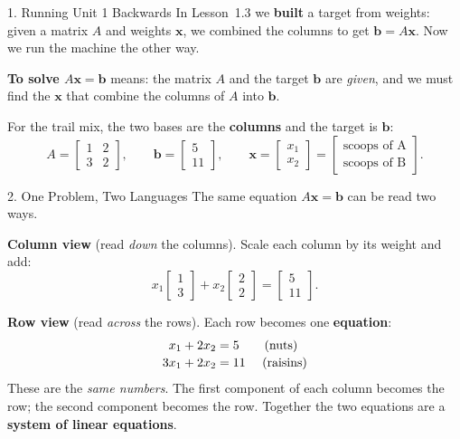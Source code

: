 \documentclass[10pt]{article}
\newcommand{\xx}{\mathbf{x}}
\newcommand{\bb}{\mathbf{b}}
\begin{document}
\begin{notesbox}{1. Running Unit 1 Backwards}
In Lesson~1.3 we \textbf{built} a target from weights: given a matrix $A$ and weights $\xx$, we
combined the columns to get $\bb = A\xx$. Now we run the machine the other way.

\vspace{2pt}
\textbf{To solve $A\xx=\bb$} means: the matrix $A$ and the target $\bb$ are \emph{given}, and we
must find the \blank{3.4cm} $\xx$ that combine the columns of $A$ into $\bb$.

\vspace{4pt}
For the trail mix, the two bases are the \textbf{columns} and the target is $\bb$:
\[
  A = \begin{bmatrix} 1 & 2 \\ 3 & 2 \end{bmatrix}, \qquad
  \bb = \begin{bmatrix} 5 \\ 11 \end{bmatrix}, \qquad
  \xx = \begin{bmatrix} x_1 \\ x_2 \end{bmatrix}
      = \begin{bmatrix} \text{scoops of A} \\ \text{scoops of B} \end{bmatrix}.
\]
\end{notesbox}

\begin{notesbox}{2. One Problem, Two Languages}
The same equation $A\xx=\bb$ can be read two ways.

\vspace{3pt}
\textbf{Column view} (read \emph{down} the columns). Scale each column by its weight and add:
\[
  x_1\begin{bmatrix} 1 \\ 3 \end{bmatrix} + x_2\begin{bmatrix} 2 \\ 2 \end{bmatrix}
  = \begin{bmatrix} 5 \\ 11 \end{bmatrix}.
\]

\textbf{Row view} (read \emph{across} the rows). Each row becomes one \textbf{equation}:
\[
  \begin{array}{r@{}c@{}l}
    x_1 &{}+ 2x_2 ={}& 5 \qquad (\text{nuts})\\[2pt]
    3x_1 &{}+ 2x_2 ={}& 11 \quad\ (\text{raisins})
  \end{array}
\]
These are the \emph{same numbers}. The first component of each column becomes the \blank{2.8cm}
row; the second component becomes the \blank{2.8cm} row. Together the two equations are a
\textbf{system of linear equations}.
\end{notesbox}
\end{document}
